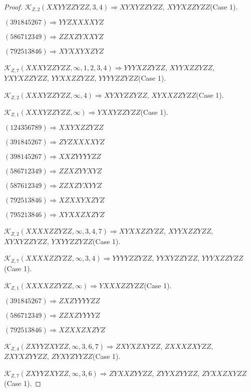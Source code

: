 \documentclass[12pt]{article}
\theoremstyle{plain}
\theoremstyle{definition}
\theoremstyle{remark}
\newcommand{\fancy}[1]{\mathcal{#1}}
\def\K{\fancy{K}}
\begin{document}
\begin{proof}
	$\K_{Z,2}(XXYYZZYZZ,3, 4)\Rightarrow $$XYXYZZYZZ$, $XYYXZZYZZ$(Case 1).
	
	
	
	$(3 9 1 8 4 5 2 6 7)\Rightarrow YYZXXXXYZ$
	
	$(5 8 6 7 1 2 3 4 9)\Rightarrow ZZXZYXXYZ$
	
	$(7 9 2 5 1 3 8 4 6)\Rightarrow XYXXYXZYZ$
	
	
	
	$\K_{Z,7}(XXXYZZYZZ,\infty,1, 2, 3, 4)\Rightarrow $$YYYXZZYZZ$, $XYYXZZYZZ$, $YXYXZZYZZ$, $YYXXZZYZZ$, $YYYYZZYZZ$(Case 1).
	
	$\K_{Z,2}(XXXYZZYZZ,\infty,4)\Rightarrow $$XYXYZZYZZ$, $XYXXZZYZZ$(Case 1).
	
	$\K_{Z,1}(XXXYZZYZZ,\infty)\Rightarrow $$YXXYZZYZZ$(Case 1).
	
	
	
	$(1 2 4 3 5 6 7 8 9)\Rightarrow XXYXZZYZZ$
	
	$(3 9 1 8 4 5 2 6 7)\Rightarrow ZYZXXXXYZ$
	
	$(3 9 8 1 4 5 2 6 7)\Rightarrow XXZYYYYZZ$
	
	$(5 8 6 7 1 2 3 4 9)\Rightarrow ZZXZYYXYZ$
	
	$(5 8 7 6 1 2 3 4 9)\Rightarrow ZZXZYXYYZ$
	
	$(7 9 2 5 1 3 8 4 6)\Rightarrow XZXXYXZYZ$
	
	$(7 9 5 2 1 3 8 4 6)\Rightarrow XYXXZXZYZ$
	
	
	
	$\K_{Z,2}(XXXXZZYZZ,\infty,3, 4, 7)\Rightarrow $$XYXXZZYZZ$, $XYYXZZYZZ$, $XYXYZZYZZ$, $YXYYZZYZZ$(Case 1).
	
	$\K_{Z,7}(XXXXZZYZZ,\infty,3, 4)\Rightarrow $$YYYYZZYZZ$, $YYXYZZYZZ$, $YYYXZZYZZ$(Case 1).
	
	$\K_{Z,1}(XXXXZZYZZ,\infty)\Rightarrow $$YXXXZZYZZ$(Case 1).
	
	
	
	$(3 9 1 8 4 5 2 6 7)\Rightarrow ZXZYYYYZZ$
	
	$(5 8 6 7 1 2 3 4 9)\Rightarrow ZZXZYYYYZ$
	
	$(7 9 2 5 1 3 8 4 6)\Rightarrow XZXXZXZYZ$
	
	
	
	$\K_{Z,4}(ZXYYZXYZZ,\infty,3, 6, 7)\Rightarrow $$ZXYXZXYZZ$, $ZXXXZXYZZ$, $ZXYXZYYZZ$, $ZYXYZYYZZ$(Case 1).
	
	$\K_{Z,7}(ZXYYZXYZZ,\infty,3, 6)\Rightarrow $$ZYXXZYYZZ$, $ZYYXZYYZZ$, $ZYXXZXYZZ$(Case 1).
	
	
	

\end{proof}
\end{document}
